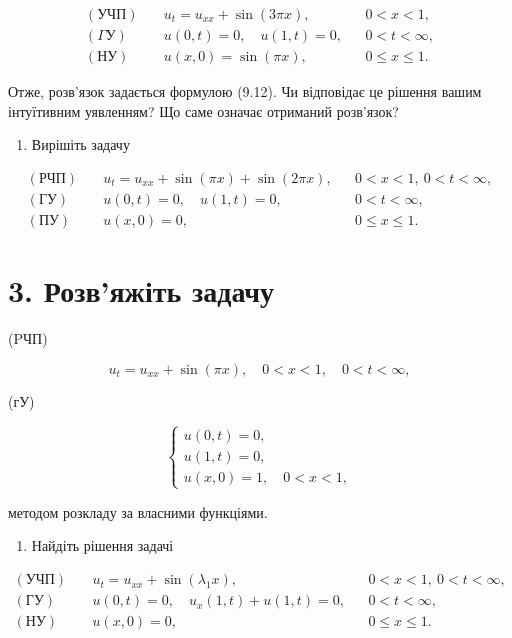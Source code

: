 \documentclass[
  ukrainian,
]{article}
\providecommand{\tightlist}{%
  \setlength{\itemsep}{0pt}\setlength{\parskip}{0pt}}
\begin{document}
\[
\begin{aligned}
(\text{УЧП}) \quad & u_t = u_{xx} + \sin(3\pi x), && 0 < x < 1, \\
(\Gamma \text{У}) \quad & u(0,t) = 0,\quad u(1,t) = 0, && 0 < t < \infty, \\
(\text{НУ}) \quad & u(x,0) = \sin(\pi x), && 0 \leqslant x \leqslant 1.
\end{aligned}
\]

Отже, розв'язок задається формулою (9.12). Чи відповідає це рішення
вашим інтуїтивним уявленням? Що саме означає отриманий розв'язок?

\begin{enumerate}
\def\labelenumi{\arabic{enumi}.}
\setcounter{enumi}{1}
\tightlist
\item
  Вирішіть задачу
\end{enumerate}

\[
\begin{aligned}
(\text{РЧП})\quad & u_t = u_{xx} + \sin(\pi x) + \sin(2\pi x), && 0 < x < 1,\ 0 < t < \infty,\\
(\text{ГУ})\quad & u(0,t)=0,\quad u(1,t)=0, && 0 < t < \infty,\\
(\text{ПУ})\quad & u(x,0)=0, && 0 \le x \le 1.
\end{aligned}
\]

\section{3. Розв'яжіть
задачу}\label{ux440ux43eux437ux432ux44fux436ux456ux442ux44c-ux437ux430ux434ux430ux447ux443}

(PЧП)

\[
u_t = u_{xx} + \sin(\pi x), \quad 0 < x < 1, \quad 0 < t < \infty,
\]

(гУ)

\[
\begin{cases} u(0, t) = 0, \\ u(1, t) = 0, \\ u(x, 0) = 1, \quad 0 < x < 1, \end{cases}
\]

методом розкладу за власними функціями.

\begin{enumerate}
\def\labelenumi{\arabic{enumi}.}
\setcounter{enumi}{3}
\tightlist
\item
  Найдіть рішення задачі
\end{enumerate}

\[
\begin{aligned}
(\text{УЧП})\quad & u_t = u_{xx} + \sin(\lambda_1 x), && 0 < x < 1,\ 0 < t < \infty, \\
(\text{ГУ})\quad & u(0,t) = 0,\quad u_x(1,t) + u(1,t) = 0, && 0 < t < \infty, \\
(\text{НУ})\quad & u(x,0) = 0, && 0 \leqslant x \leqslant 1.
\end{aligned}
\]
\end{document}
